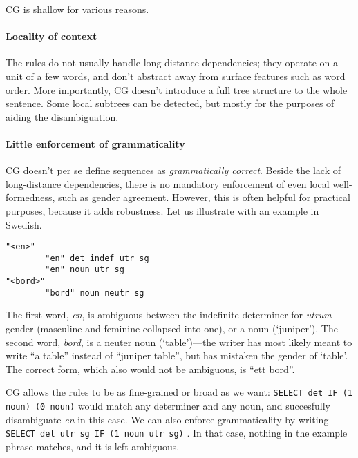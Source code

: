 CG is shallow for various reasons.

\paragraph{Locality of context} The rules do not usually handle 
long-distance dependencies; they operate on a unit of a few words, and
don't abstract away from surface features such as word order.
More importantly, CG doesn't introduce a full tree structure to the
whole sentence. Some local subtrees can be detected, but mostly
for the purposes of aiding the disambiguation.
 
\paragraph{Little enforcement of grammaticality} CG doesn't
per se define sequences as \emph{grammatically correct}.
Beside the lack of long-distance dependencies, there is
no mandatory enforcement of even local well-formedness, such as gender agreement.
However, this is often helpful for practical purposes, because it adds robustness.
Let us illustrate with an example in Swedish.

\begin{verbatim}
"<en>"
        "en" det indef utr sg
        "en" noun utr sg 
"<bord>"
        "bord" noun neutr sg
\end{verbatim}

The first word, \emph{en}, is ambiguous between the indefinite determiner for
\emph{utrum} gender  (masculine and feminine collapsed into one), or a noun (`juniper').
The second word, \emph{bord}, is a neuter noun (`table')---the writer has
most likely meant to write ``a table'' instead of ``juniper table'', but has mistaken the gender of `table'. The correct form, which also would not be ambiguous, is ``ett bord''.

CG allows the rules to be as fine-grained or broad as we want: 
\texttt{SELECT det IF (1 noun) (0 noun)} would match any determiner and any noun, 
and succesfully disambiguate \emph{en} in this case. 
We can also enforce grammaticality by writing \texttt{SELECT det utr sg IF (1 noun utr sg)}%
. In that case, nothing in the example phrase matches, and it is left ambiguous.


